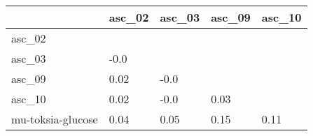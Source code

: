 \begin{tabular}{lllll}
\toprule
{} & asc\_02 & asc\_03 & asc\_09 & asc\_10 \\
\midrule
asc\_02            &        &        &        &        \\
asc\_03            &   -0.0 &        &        &        \\
asc\_09            &   0.02 &   -0.0 &        &        \\
asc\_10            &   0.02 &   -0.0 &   0.03 &        \\
mu-toksia-glucose &   0.04 &   0.05 &   0.15 &   0.11 \\
\bottomrule
\end{tabular}
